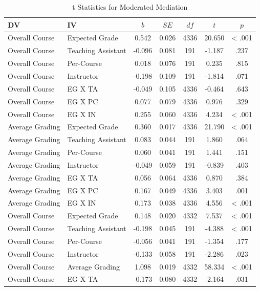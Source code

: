 \documentclass[,man,mask]{apa6}
\begin{document}
\begin{table}[tbp]
\begin{center}
\begin{threeparttable}
\caption{\label{tab:table-mod-med}t Statistics for Moderated Mediation}
\small{
\begin{tabular}{llccccc}
\toprule
DV & IV & $b$ & $SE$ & $df$ & $t$ & $p$\\
\midrule
Overall Course & Expected Grade & 0.542 & 0.026 & 4336 & 20.650 & < .001\\
Overall Course & Teaching Assistant & -0.096 & 0.081 & 191 & -1.187 & .237\\
Overall Course & Per-Course & 0.018 & 0.076 & 191 & 0.235 & .815\\
Overall Course & Instructor & -0.198 & 0.109 & 191 & -1.814 & .071\\
Overall Course & EG X TA & -0.049 & 0.105 & 4336 & -0.464 & .643\\
Overall Course & EG X PC & 0.077 & 0.079 & 4336 & 0.976 & .329\\
Overall Course & EG X IN & 0.255 & 0.060 & 4336 & 4.234 & < .001\\
Average Grading & Expected Grade & 0.360 & 0.017 & 4336 & 21.790 & < .001\\
Average Grading & Teaching Assistant & 0.083 & 0.044 & 191 & 1.860 & .064\\
Average Grading & Per-Course & 0.060 & 0.041 & 191 & 1.441 & .151\\
Average Grading & Instructor & -0.049 & 0.059 & 191 & -0.839 & .403\\
Average Grading & EG X TA & 0.056 & 0.064 & 4336 & 0.870 & .384\\
Average Grading & EG X PC & 0.167 & 0.049 & 4336 & 3.403 & .001\\
Average Grading & EG X IN & 0.173 & 0.038 & 4336 & 4.556 & < .001\\
Overall Course & Expected Grade & 0.148 & 0.020 & 4332 & 7.537 & < .001\\
Overall Course & Teaching Assistant & -0.198 & 0.045 & 191 & -4.388 & < .001\\
Overall Course & Per-Course & -0.056 & 0.041 & 191 & -1.354 & .177\\
Overall Course & Instructor & -0.133 & 0.058 & 191 & -2.286 & .023\\
Overall Course & Average Grading & 1.098 & 0.019 & 4332 & 58.334 & < .001\\
Overall Course & EG X TA & -0.173 & 0.080 & 4332 & -2.164 & .031\\

\end{tabular}}
\end{threeparttable}
\end{center}
\end{table}
\end{document}
